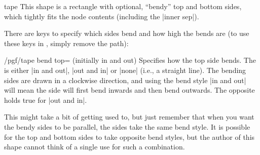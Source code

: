 \begin{shape}{tape}
	This shape is a rectangle with optional, ``bendy'' top and bottom
	sides, which tightly fits the node contents (including the
	|inner sep|).
	
\begin{codeexample}[]
\end{codeexample}

  There are \pgfname{} keys to specify which sides bend and how high
  the bends are (to use these keys in \tikzname{}, simply remove the
   path):

  \begin{key}{/pgf/tape bend top= (initially in and out)}
  	Specifies how the top side bends. The  is either
  	|in and out|, |out and in| or |none| (i.e., a straight line).
  	The bending sides are drawn in a
  	clockwise direction, and using the bend style |in and out| will mean
  	the side will first	bend inwards and then bend outwards.
  	The opposite holds true for	|out and in|.
  	
\begin{codeexample}[]
\end{codeexample}

    This might take a bit of getting used to, but just remember that
    when you want the bendy sides to be parallel, the sides take the
    same bend style. It is possible for the top and bottom sides to
    take opposite bend styles, but the author of this shape cannot
    think of a single use for such a combination.

\begin{codeexample}[]
\end{codeexample}


\end{key}
\end{shape}
